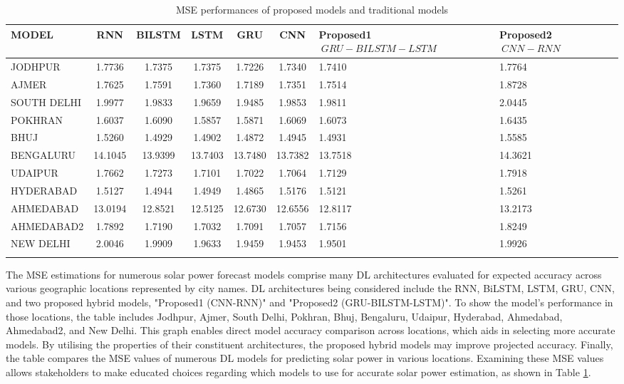 \documentclass[a4paper,fleqn]{cas-sc}
\begin{document}
\begin{table}[!ht]
\centering
\caption{MSE performances of proposed models  and traditional models}
\begin{tabular}{|l|c|c|c|c|c|p{}|p{}|}
\hline
\textbf{MODEL} & \textbf{RNN} & \textbf{BILSTM} & \textbf{LSTM} & \textbf{GRU} & \textbf{CNN} &\textbf{Proposed1 \(\ GRU-BILSTM-LSTM \)\ } & \textbf{Proposed2 \(\ CNN-RNN\)\ } \\ \hline
JODHPUR & 1.7736 & 1.7375 & 1.7375 & 1.7226 & 1.7340 & 1.7410 & 1.7764 \\ \hline
AJMER & 1.7625 & 1.7591 & 1.7360 & 1.7189 & 1.7351 & 1.7514 & 1.8728 \\ \hline
SOUTH DELHI & 1.9977 & 1.9833 & 1.9659 & 1.9485 & 1.9853 & 1.9811 & 2.0445 \\ \hline
POKHRAN & 1.6037 & 1.6090 & 1.5857 & 1.5871 & 1.6069 & 1.6073 & 1.6435 \\ \hline
BHUJ & 1.5260 & 1.4929 & 1.4902 & 1.4872 & 1.4945 & 1.4931 & 1.5585 \\ \hline
BENGALURU & 14.1045 & 13.9399 & 13.7403 & 13.7480 & 13.7382 & 13.7518 & 14.3621 \\ \hline
UDAIPUR & 1.7662 & 1.7273 & 1.7101 & 1.7022 & 1.7064 & 1.7129 & 1.7918 \\ \hline
HYDERABAD & 1.5127 & 1.4944 & 1.4949 & 1.4865 & 1.5176 & 1.5121 & 1.5261 \\ \hline
AHMEDABAD & 13.0194 & 12.8521 & 12.5125 & 12.6730 & 12.6556 & 12.8117 & 13.2173 \\ \hline
AHMEDABAD2 & 1.7892 & 1.7190 & 1.7032 & 1.7091 & 1.7057 & 1.7156 & 1.8249 \\ \hline
NEW DELHI & 2.0046 & 1.9909 & 1.9633 & 1.9459 & 1.9453 & 1.9501 & 1.9926 \\ \hline
\label{MSE}
\end{tabular}
\end{table}
The MSE estimations for numerous solar power forecast models comprise many DL architectures evaluated for expected accuracy across various geographic locations represented by city names. DL architectures being considered include the RNN, BiLSTM, LSTM, GRU, CNN, and two proposed hybrid models, "Proposed1 (CNN-RNN)" and "Proposed2 (GRU-BILSTM-LSTM)". To show the model's performance in those locations, the table includes Jodhpur, Ajmer, South Delhi, Pokhran, Bhuj, Bengaluru, Udaipur, Hyderabad, Ahmedabad, Ahmedabad2, and New Delhi. This graph enables direct model accuracy comparison across locations, which aids in selecting more accurate models. By utilising the properties of their constituent architectures, the proposed hybrid models may improve projected accuracy. Finally, the table compares the MSE values of numerous DL models for predicting solar power in various locations. Examining these MSE values allows stakeholders to make educated choices regarding which models to use for accurate solar power estimation, as shown in Table \ref{MSE}.
\end{document}
